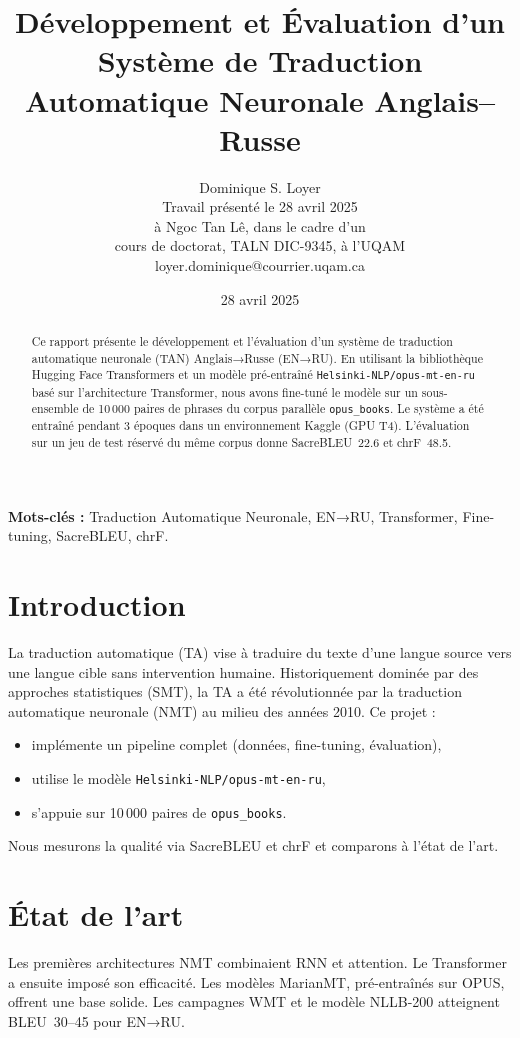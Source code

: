 \documentclass[11pt,a4paper]{article}
\title{Développement et Évaluation d'un Système de Traduction Automatique Neuronale Anglais–Russe}
\author{Dominique S. Loyer\\
  Travail présenté le 28 avril 2025 \\
  à Ngoc Tan Lê, dans le cadre d'un \\
  cours de doctorat, TALN DIC-9345, à l'UQAM \\
  loyer.dominique@courrier.uqam.ca \\}
\date{28 avril 2025}
\begin{document}
\maketitle

\begin{abstract}
Ce rapport présente le développement et l'évaluation d'un système de traduction automatique neuronale (TAN) Anglais→Russe (EN→RU). En utilisant la bibliothèque Hugging Face Transformers\citep{Wolf2020Transformers} et un modèle pré-entraîné \texttt{Helsinki-NLP/opus-mt-en-ru}\citep{Junczys-Dowmunt2018Marian} basé sur l'architecture Transformer\citep{Vaswani2017Attention}, nous avons fine-tuné le modèle sur un sous-ensemble de 10\,000 paires de phrases du corpus parallèle \texttt{opus\_books}\citep{Tiedemann2009Parallel}. Le système a été entraîné pendant 3 époques dans un environnement Kaggle (GPU T4). L'évaluation sur un jeu de test réservé du même corpus donne SacreBLEU~22.6 et chrF~48.5.
\end{abstract}

\noindent\textbf{Mots-clés :} Traduction Automatique Neuronale, EN→RU, Transformer, Fine-tuning, SacreBLEU, chrF.

\section{Introduction}
La traduction automatique (TA) vise à traduire du texte d'une langue source vers une langue cible sans intervention humaine. Historiquement dominée par des approches statistiques (SMT), la TA a été révolutionnée par la traduction automatique neuronale (NMT) au milieu des années 2010\citep{Bahdanau2021Neural}. Ce projet :
\begin{itemize}
  \item implémente un pipeline complet (données, fine-tuning, évaluation),
  \item utilise le modèle \texttt{Helsinki-NLP/opus-mt-en-ru}\citep{Junczys-Dowmunt2018Marian},
  \item s'appuie sur 10\,000 paires de \texttt{opus\_books}\citep{Tiedemann2009Parallel}.
\end{itemize}
Nous mesurons la qualité via SacreBLEU et chrF et comparons à l'état de l'art.

\section{État de l'art}
Les premières architectures NMT combinaient RNN et attention\citep{Bahdanau2021Neural}. Le Transformer\citep{Vaswani2017Attention} a ensuite imposé son efficacité. Les modèles MarianMT\citep{Junczys-Dowmunt2018Marian}, pré-entraînés sur OPUS, offrent une base solide.
Les campagnes WMT et le modèle NLLB-200\citep{NLLB2025No} atteignent BLEU~30–45 pour EN→RU.
\end{document}
